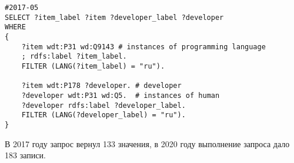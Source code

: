 \begin{lstlisting}[language=SPARQL, label=lst:filling_label]
#2017-05
SELECT ?item_label ?item ?developer_label ?developer
WHERE
{
    ?item wdt:P31 wd:Q9143 # instances of programming language
    ; rdfs:label ?item_label. 
    FILTER (LANG(?item_label) = "ru"). 

    ?item wdt:P178 ?developer. # developer 
    ?developer wdt:P31 wd:Q5.  # instances of human
    ?developer rdfs:label ?developer_label. 
    FILTER (LANG(?developer_label) = "ru").  
}
\end{lstlisting}
В 2017 году запрос вернул 133 значения, в 2020 году выполнение запроса дало 183 записи. 